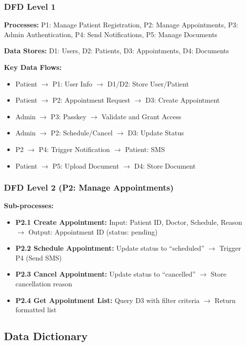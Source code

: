 \documentclass[11pt,a4paper]{article}
\begin{document}
\subsubsection{DFD Level 1}

\textbf{Processes:} P1: Manage Patient Registration, P2: Manage Appointments, P3: Admin Authentication, P4: Send Notifications, P5: Manage Documents

\textbf{Data Stores:} D1: Users, D2: Patients, D3: Appointments, D4: Documents

\textbf{Key Data Flows:}
\begin{itemize}
    \item Patient $\rightarrow$ P1: User Info $\rightarrow$ D1/D2: Store User/Patient
    \item Patient $\rightarrow$ P2: Appointment Request $\rightarrow$ D3: Create Appointment
    \item Admin $\rightarrow$ P3: Passkey $\rightarrow$ Validate and Grant Access
    \item Admin $\rightarrow$ P2: Schedule/Cancel $\rightarrow$ D3: Update Status
    \item P2 $\rightarrow$ P4: Trigger Notification $\rightarrow$ Patient: SMS
    \item Patient $\rightarrow$ P5: Upload Document $\rightarrow$ D4: Store Document
\end{itemize}

\subsubsection{DFD Level 2 (P2: Manage Appointments)}

\textbf{Sub-processes:}
\begin{itemize}
    \item \textbf{P2.1 Create Appointment:} Input: Patient ID, Doctor, Schedule, Reason $\rightarrow$ Output: Appointment ID (status: pending)
    \item \textbf{P2.2 Schedule Appointment:} Update status to ``scheduled'' $\rightarrow$ Trigger P4 (Send SMS)
    \item \textbf{P2.3 Cancel Appointment:} Update status to ``cancelled'' $\rightarrow$ Store cancellation reason
    \item \textbf{P2.4 Get Appointment List:} Query D3 with filter criteria $\rightarrow$ Return formatted list
\end{itemize}

\subsection{Data Dictionary}
\end{document}
